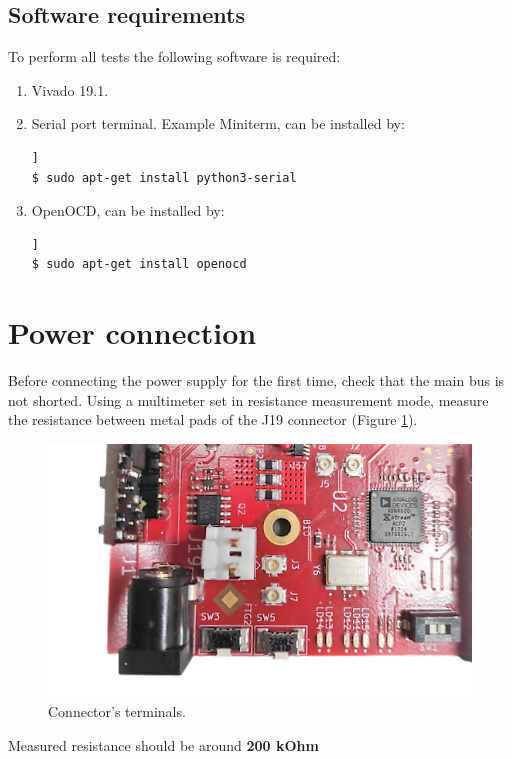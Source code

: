 \documentclass[12pt,oneside,a4]{article}
\begin{document}
\subsection{Software requirements}
To perform all tests the following software is required:
\begin{enumerate}
    \item Vivado 19.1.
    \item Serial port terminal. Example Miniterm, can be installed by:	\begin{lstlisting}[backgroundcolor = \color{Gainsboro}, language=bash, frame=none]]
$ sudo apt-get install python3-serial
	\end{lstlisting}
	\item OpenOCD, can be installed by:
	\begin{lstlisting}[backgroundcolor = \color{Gainsboro}, language=bash, frame=none]]
$ sudo apt-get install openocd
	\end{lstlisting}
	
    
\end{enumerate}

\section{Power connection}
Before connecting the power supply for the first time, check that the main bus is not shorted. Using a multimeter set in resistance measurement mode, measure the resistance between metal pads of the J19 connector (Figure \ref{01}).
\begin{figure}[H]
\begin{center}
\includegraphics[width=0.9\linewidth]{J19.png}
 \caption{Connector's terminals. }\label{01}
\end{center}
\end{figure}
\begin{leftbar}
Measured resistance should be around \textbf{{\color{red}200 kOhm}}
\end{leftbar}
\end{document}
